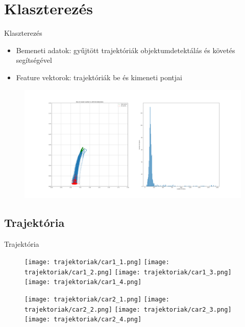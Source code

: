 \documentclass{beamer}
\begin{document}
\section{Klaszterezés}
\begin{frame}{Klaszterezés}
    \begin{itemize}
        \item Bemeneti adatok: gyűjtött trajektóriák objektumdetektálás és követés segítségével
        \item Feature vektorok: trajektóriák be és kimeneti pontjai
    \end{itemize}
    \begin{figure}
        \includegraphics[scale=0.15]{../clustering/n_cluster_0_n_tracks_933.png}
    \end{figure}
\end{frame}

\subsection{Trajektória}
\begin{frame}{Trajektória}
   \begin{figure}
        \texttt{[image: trajektoriak/car1\_1.png]}
        \texttt{[image: trajektoriak/car1\_2.png]}
        \texttt{[image: trajektoriak/car1\_3.png]}
        \texttt{[image: trajektoriak/car1\_4.png]}
   \end{figure} 
   \begin{figure}
        \texttt{[image: trajektoriak/car2\_1.png]}
        \texttt{[image: trajektoriak/car2\_2.png]}
        \texttt{[image: trajektoriak/car2\_3.png]}
        \texttt{[image: trajektoriak/car2\_4.png]}
   \end{figure} 
\end{frame}
\end{document}
